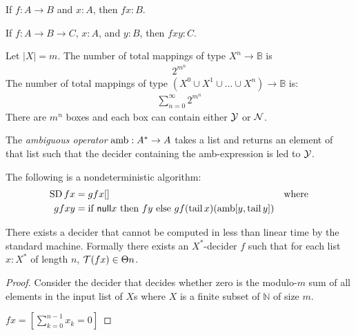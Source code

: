 If $f : A\to B$ and $x:A$, then $fx : B$.

If $f : A\to B\to C$, $x:A$, and $y:B$, then $fxy : C$.





\begin{mcor}
    Let $|X| = m$.
    The number of total mappings of type $X^n \to \mathbb B$ is
    \begin{align}
        2^{m^n}
    \end{align}
    The number of total mappings of type $(X^0 \cup X^1 \cup \ldots \cup X^n) \to \mathbb B$ is:
    \begin{align}
        \sum_{n=0}^{\infty} 2^{m^n}
    \end{align}
    There are $m^n$ boxes and each box can contain either $\mathcal Y$ or $\mathcal N$.
\end{mcor}





\begin{mdef}
    The \emph{ambiguous operator} $\operatorname{amb} : A^* \to A$
    takes a list and returns an element of that list
    such that the decider containing the amb-expression is led to $\mathcal Y$.
\end{mdef}

    The following is a nondeterministic algorithm:
    \begin{align}
        \operatorname{SD} fx &= gfx[] & \text{where}
        \\
        gfxy &= \text{if}~\textsf{null} x~\text{then}~fy~\text{else}~gf(\operatorname{tail} x)(\operatorname{amb}[y, \operatorname{tail} y])
    \end{align}






\begin{mlem}
There exists a decider that cannot be computed
in less than linear time
by the standard machine.
Formally there exists an $X^*$-decider $f$ such that
for each list $x : X^*$ of length $n$,
$\mathcal{T}(fx) \in \Theta n$.
\begin{proof}
    Consider the decider that decides whether zero
    is the modulo-$m$ sum of all elements in the input list of $X$s
    where $X$ is a finite subset of $\mathbb N$ of size $m$.

    $f x = [\sum_{k=0}^{n-1} x_k = 0]$
\end{proof}
\end{mlem}

